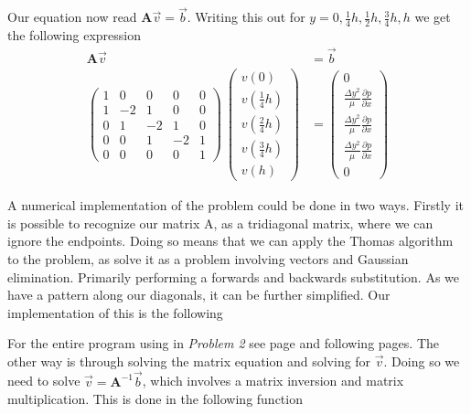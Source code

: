 \documentclass[10pt, a4paper]{amsart}
\begin{document}
Our equation now read $\mathbf{A}\vec{v} = \vec{b}$. Writing this out for $y = 0, \frac{1}{4}h, \frac{1}{2}h, \frac{3}{4}h, h$ we get the following expression
\begin{equation}
 \begin{split}
	\mathbf{A}\vec{v} &= \vec{b}\\
	\begin{pmatrix}
	1 & 0 & 0 & 0 & 0\\
	1 & -2 & 1 & 0 & 0\\
	0 & 1 & -2 & 1 & 0\\
	0 & 0 & 1 & -2 & 1 \\
	0 & 0 & 0 & 0 & 1
	\end{pmatrix}
	~ 
	\begin{pmatrix}
	v(0) \\
	v(\frac{1}{4}h)\\
	v(\frac{2}{4}h)\\
	v(\frac{3}{4}h)\\
	v(h)
	\end{pmatrix}
	&= 
	\begin{pmatrix}
	0 \\
	\frac{\Delta y^2}{\mu}\frac{\partial p}{\partial x}\\
	\frac{\Delta y^2}{\mu}\frac{\partial p}{\partial x}\\
	\frac{\Delta y^2}{\mu}\frac{\partial p}{\partial x}\\
	0
	\end{pmatrix}
 \end{split}
\end{equation}

A numerical implementation of the problem could be done in two ways. Firstly it is possible to recognize our matrix A, as a tridiagonal matrix, where we can ignore the endpoints. Doing so means that we can apply the Thomas algorithm to the problem, as solve it as a problem involving vectors and Gaussian elimination. Primarily performing a forwards and backwards substitution. As we have a pattern along our diagonals, it can be further simplified. Our implementation of this is the following 


For the entire program using in \textit{Problem 2} see page \pageref{tridiag} and following pages. 
The other way is through solving the matrix equation and solving for $\vec{v}$. Doing so we need to solve $\vec{v} = \mathbf{A}^{-1}\vec{b}$, which involves a matrix inversion and matrix multiplication. 
This is done in the following function

\end{document}
